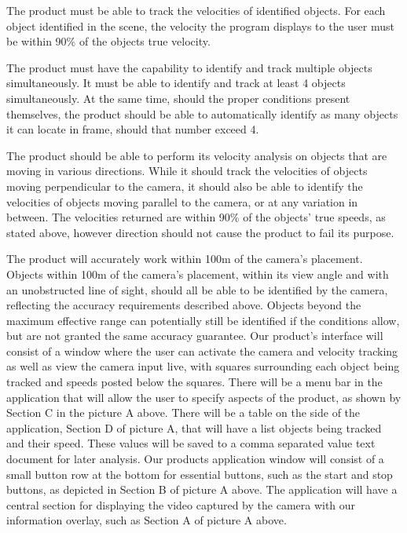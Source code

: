 \documentclass[letterpaper,10pt,onecolumn,draftclsnofoot]{IEEEtran}
\begin{document}
The product must be able to track the velocities of identified objects.
For each object identified in the scene, the velocity the program displays to the user must be within 90\% of the objects true velocity.

The product must have the capability to identify and track multiple objects simultaneously.
It must be able to identify and track at least 4 objects simultaneously.
At the same time, should the proper conditions present themselves, the product should be able to automatically identify as many objects it can locate in frame, should that number exceed 4.

The product should be able to perform its velocity analysis on objects that are moving in various directions.
While it should track the velocities of objects moving perpendicular to the camera, it should also be able to identify the velocities of objects moving parallel to the camera, or at any variation in between.
The velocities returned are within 90\% of the objects' true speeds, as stated above, however direction should not cause the product to fail its purpose.

The product will accurately work within 100m of the camera's placement.
Objects within 100m of the camera's placement, within its view angle and with an unobstructed line of sight, should all be able to be identified by the camera, reflecting the accuracy requirements described above.
Objects beyond the maximum effective range can potentially still be identified if the conditions allow, but are not granted the same accuracy guarantee.
Our product's interface will consist of a window where the user can activate the camera and velocity tracking as well as view the camera input live, with squares surrounding each object being tracked and speeds posted below the squares.
There will be a menu bar in the application that will allow the user to specify aspects of the product, as shown by Section C in the picture A above.
There will be a table on the side of the application, Section D of picture A, that will have a list objects being tracked and their speed.
These values will be saved to a comma separated value text document for later analysis.
Our products application window will consist of a small button row at the bottom for essential buttons, such as the start and stop buttons, as depicted in Section B of picture A above.
The application will have a central section for displaying the video captured by the camera with our information overlay, such as Section A of picture A above.
\end{document}
